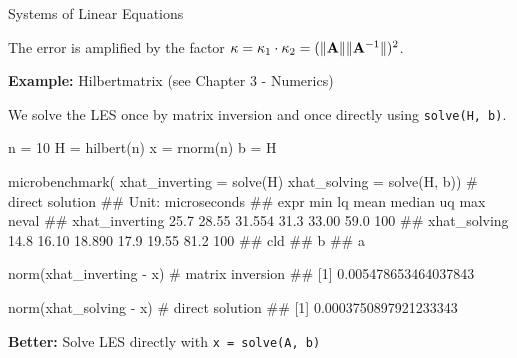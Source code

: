 \begin{vbframe}{Systems of Linear Equations}
\begin{itemize}
 The error is amplified by the factor $\kappa = \kappa_1 \cdot \kappa_2 = (\|\mathbf{A}\|\|\mathbf{A}^{-1}\|)^2$.
\end{itemize}

\framebreak

\textbf{Example:} Hilbertmatrix (see Chapter 3 - Numerics)

\vspace*{0.1cm}

We solve the LES once by matrix inversion and once directly using \texttt{solve(H, b)}. 
\footnotesize
\vspace{0.5cm}

\begin{verbbox}
n = 10
H = hilbert(n)
x = rnorm(n)
b = H %
\end{verbbox}
\col

\framebreak
\vspace{0.1cm}
\begin{verbbox}
microbenchmark(
xhat_inverting = solve(H) %
xhat_solving = solve(H, b)) # direct solution
## Unit: microseconds
## expr min lq mean median uq max neval
## xhat_inverting 25.7 28.55 31.554 31.3 33.00 59.0 100
## xhat_solving 14.8 16.10 18.890 17.9 19.55 81.2 100
## cld
## b
## a
\end{verbbox}
\col

\vspace{0.3cm}
\begin{verbbox}
norm(xhat_inverting - x) # matrix inversion
## [1] 0.005478653464037843

norm(xhat_solving - x) # direct solution
## [1] 0.0003750897921233343
\end{verbbox}
\col







\framebreak
\normalsize
\textbf{Better:} Solve LES directly with \texttt{x = solve(A, b)}


\end{vbframe}
